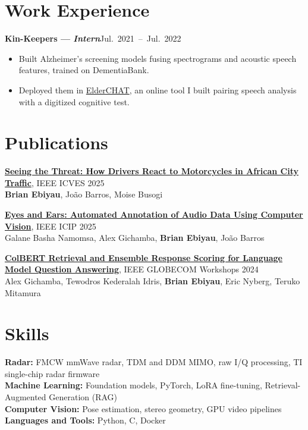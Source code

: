 \documentclass[10pt,letterpaper]{article}
\newcommand{\project}[2]{\needspace{4\baselineskip}\textbf{#1}\hfill \mbox{#2}\par}
\newcommand{\pub}[4]{\textbf{\href{#2}{\color{black}#1}}, #3\\ #4\par\vspace{0.6em}}
\newcommand{\me}{\textbf{Brian Ebiyau}}
\begin{document}
\section{Work Experience}
\project{Kin-Keepers \textmd{--- \textit{Intern}}}{Jul. 2021 -- Jul. 2022}
\begin{itemize}
  \item Built Alzheimer's screening models fusing spectrograms and acoustic speech features, trained on DementiaBank.
  \item Deployed them in \href{https://o2gventures.com/memorytest/}{ElderCHAT}, an online tool I built pairing speech
        analysis with a digitized cognitive test.
\end{itemize}

\section{Publications}
\pub{Seeing the Threat: How Drivers React to Motorcycles in African City Traffic}
    {https://ieeexplore.ieee.org/abstract/document/11376493/}
    {IEEE ICVES 2025}
    {\me, João Barros, Moise Busogi}
\pub{Eyes and Ears: Automated Annotation of Audio Data Using Computer Vision}
    {https://ieeexplore.ieee.org/abstract/document/11084628/}
    {IEEE ICIP 2025}
    {Galane Basha Namomsa, Alex Gichamba, \me, João Barros}
\pub{ColBERT Retrieval and Ensemble Response Scoring for Language Model Question Answering}
    {https://doi.org/10.1109/GCWkshp64532.2024.11100297}
    {IEEE GLOBECOM Workshops 2024}
    {Alex Gichamba, Tewodros Kederalah Idris, \me, Eric Nyberg, Teruko Mitamura}
\vspace{-0.6em}

\section{Skills}
\textbf{Radar:} FMCW mmWave radar, TDM and DDM MIMO, raw I/Q processing, TI single-chip radar firmware\\[0.3em]
\textbf{Machine Learning:} Foundation models, PyTorch, LoRA fine-tuning, Retrieval-Augmented Generation (RAG)\\[0.3em]
\textbf{Computer Vision:} Pose estimation, stereo geometry, GPU video pipelines\\[0.3em]
\textbf{Languages and Tools:} Python, C, Docker
\end{document}
